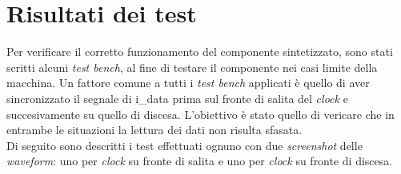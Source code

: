 \documentclass{article}
\begin{document}
\section{Risultati dei test}
Per verificare il corretto funzionamento del componente sintetizzato, sono stati scritti alcuni \textit{test bench}, al fine di testare il componente nei casi limite della macchina. Un fattore comune a tutti i \textit{test bench} applicati è quello di aver sincronizzato il segnale di {\selectfont i\_data} prima sul fronte di salita del \textit{clock} e succesivamente su quello di discesa. L'obiettivo è stato quello di vericare che in entrambe le situazioni la lettura dei dati non risulta sfasata.\\Di seguito sono descritti i test effettuati ognuno con due \textit{screenshot} delle \textit{waveform}: uno per \textit{clock} su fronte di salita e uno per \textit{clock} su fronte di discesa.\\
\end{document}
